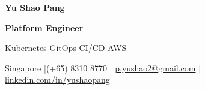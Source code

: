 \documentclass[10pt,a4paper]{article}
\begin{document}
\sourcesanspro
\fontsize{9.5pt}{11.25pt}\selectfont

\begin{center}
  {\fontsize{26pt}{29pt}\selectfont\bfseries Yu Shao Pang}\par
  \vspace{1.0pt}
  {\fontsize{11pt}{13pt}\selectfont\bfseries\color{accent} Platform Engineer}\par
  \vspace{1.0pt}
  {\fontsize{9pt}{11pt}\selectfont Kubernetes \textbullet{} GitOps \textbullet{} CI/CD \textbullet{} AWS}\par
  \vspace{4.0pt}
  {\fontsize{9pt}{10.8pt}\selectfont
  Singapore \enspace|\enspace (+65) 8310 8770 \enspace|\enspace
  \href{mailto:p.yushao2@gmail.com}{p.yushao2@gmail.com} \enspace|\enspace
  \href{https://www.linkedin.com/in/yushaopang}{linkedin.com/in/yushaopang}}
\end{center}
\vspace{-2pt}





\end{document}
